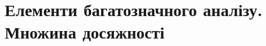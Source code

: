 \documentclass[a4paper, 12pt]{article}
\theoremstyle{definition}
\numberwithin{equation}{section}
\begin{document}
\setcounter{section}{1}
\section{Елементи багатозначного аналізу. Множина досяжності}






\end{document}
